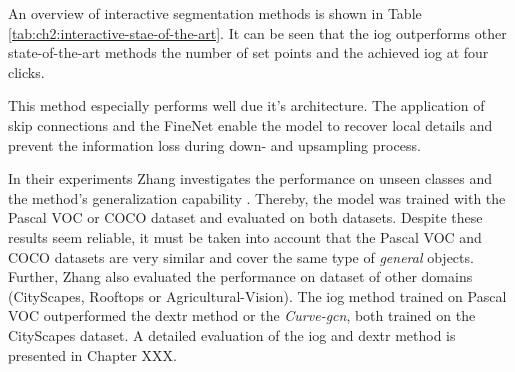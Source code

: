 An overview of interactive segmentation methods is shown in Table \ref{tab:ch2:interactive-stae-of-the-art}.
It can be seen that the \gls{iog} outperforms other state-of-the-art methods the number of set points and the achieved \gls{iog} at four clicks.

This method especially performs well due it's  architecture.
The application of skip connections and the FineNet enable the model to recover local details and prevent the information loss during down- and upsampling process.

In their experiments Zhang investigates the performance on unseen classes and the method's generalization capability \Cite{Zha20-IOG}.
Thereby, the model was trained with the Pascal VOC or COCO dataset and evaluated on both datasets.
Despite these results seem reliable, it must be taken into account that the Pascal VOC and COCO datasets are very similar and cover the same type of \textit{general} objects.
Further, Zhang also evaluated the performance on dataset of other domains (\eg CityScapes, Rooftops or Agricultural-Vision).
The \gls{iog} method trained on Pascal VOC outperformed the \gls{dextr} method or the \textit{Curve-\gls{gcn}}, both trained on the CityScapes dataset.
A detailed evaluation of the \gls{iog} and \gls{dextr} method is presented in Chapter XXX. 
